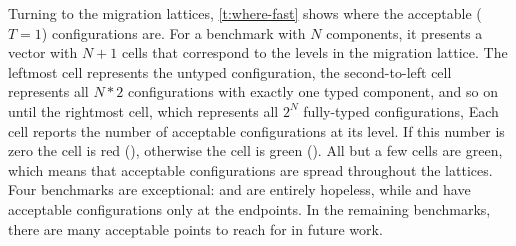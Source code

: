 Turning to the migration lattices, \cref{t:where-fast} shows where the
acceptable ($T  = 1$)
configurations are.
For a benchmark with $N$ components, it presents a vector with $N+1$ cells
that correspond to the levels in the migration lattice.
The leftmost cell represents the untyped configuration,
the second-to-left cell represents all $N * 2$ configurations with exactly one
typed component, and so on until the rightmost cell, which
represents all $2^N$ fully-typed configurations,
Each cell reports the number of acceptable configurations at its level.
If this number is zero the cell is red (\rboxtiny{}), otherwise
the cell is green (\gboxtiny{}).
All but a few cells are green, which means that acceptable configurations
are spread throughout the lattices.
Four benchmarks are exceptional:
 and  are entirely hopeless, while
 and  have acceptable configurations only
at the endpoints.
In the remaining benchmarks, there are many acceptable points to
reach for in future work.

